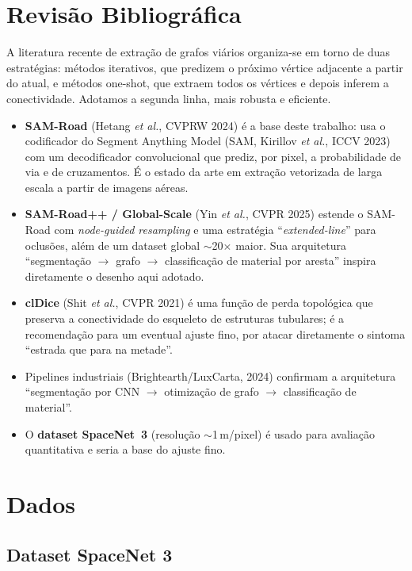 \documentclass[12pt]{article}
\begin{document}
\section{Revisão Bibliográfica}

A literatura recente de extração de grafos viários organiza-se em torno de duas
estratégias: métodos iterativos, que predizem o próximo vértice
adjacente a partir do atual, e métodos one-shot, que extraem todos os
vértices e depois inferem a conectividade. Adotamos a segunda linha, mais
robusta e eficiente.

\begin{itemize}
    \item \textbf{SAM-Road} (Hetang \textit{et al.}, CVPRW 2024) é a base deste
    trabalho: usa o codificador do Segment Anything Model (SAM,
    Kirillov \textit{et al.}, ICCV 2023) com um decodificador convolucional
    que prediz, por pixel, a probabilidade de via e de cruzamentos. É o estado
    da arte em extração vetorizada de larga escala a partir de imagens aéreas.
    \item \textbf{SAM-Road++ / Global-Scale} (Yin \textit{et al.}, CVPR 2025)
    estende o SAM-Road com \textit{node-guided resampling} e uma estratégia
    ``\textit{extended-line}'' para oclusões, além de um dataset global $\sim$20$\times$
    maior. Sua arquitetura ``segmentação $\rightarrow$ grafo $\rightarrow$
    classificação de material por aresta'' inspira diretamente o desenho aqui
    adotado.
    \item \textbf{clDice} (Shit \textit{et al.}, CVPR 2021) é uma função de
    perda topológica que preserva a conectividade do esqueleto de estruturas
    tubulares; é a recomendação para um eventual ajuste fino, por atacar
    diretamente o sintoma ``estrada que para na metade''.
    \item Pipelines industriais (Brightearth/LuxCarta, 2024) confirmam a
    arquitetura ``segmentação por CNN $\rightarrow$ otimização de grafo $\rightarrow$
    classificação de material''.
    \item O \textbf{dataset SpaceNet~3} (resolução $\sim$1\,m/pixel) é usado para
    avaliação quantitativa e seria a base do ajuste fino.
\end{itemize}

\section{Dados}

\subsection{Dataset SpaceNet 3}
\end{document}
